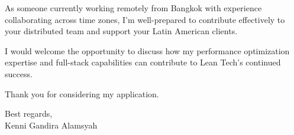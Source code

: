 \documentclass[11pt,a4paper]{article}
\begin{document}
\vspace{1em}

As someone currently working remotely from Bangkok with experience collaborating across time zones, I'm well-prepared to contribute effectively to your distributed team and support your Latin American clients.

\vspace{1em}

I would welcome the opportunity to discuss how my performance optimization expertise and full-stack capabilities can contribute to Lean Tech's continued success.

\vspace{1em}

Thank you for considering my application.

\vspace{1em}

Best regards,\\
Kenni Gandira Alamsyah
\end{document}
